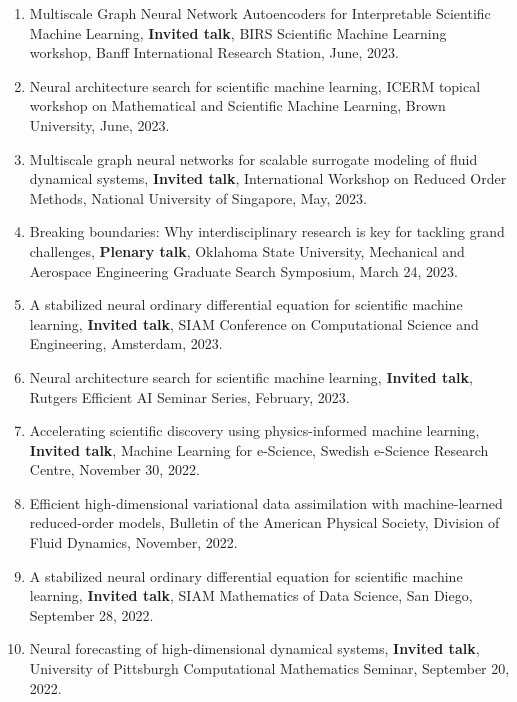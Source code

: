 \documentclass[letterpaper]{article}
\begin{document}
\begin{enumerate}
\item Multiscale Graph Neural Network Autoencoders for Interpretable Scientific Machine Learning, \textbf{Invited talk}, BIRS Scientific Machine Learning workshop, Banff International Research Station, June, 2023.

\item Neural architecture search for scientific machine learning, ICERM topical workshop on Mathematical and Scientific Machine Learning, Brown University, June, 2023.

\item Multiscale graph neural networks for scalable surrogate modeling of fluid dynamical systems, \textbf{Invited talk}, International Workshop on Reduced Order Methods, National University of Singapore, May, 2023.

\item Breaking boundaries: Why interdisciplinary research is key for tackling grand challenges, \textbf{Plenary talk}, Oklahoma State University, Mechanical and Aerospace Engineering Graduate Search Symposium, March 24, 2023.

\item A stabilized neural ordinary differential equation for scientific machine learning, \textbf{Invited talk}, SIAM Conference on Computational Science and Engineering, Amsterdam, 2023.

\item Neural architecture search for scientific machine learning, \textbf{Invited talk}, Rutgers Efficient AI Seminar Series, February, 2023.

\item Accelerating scientific discovery using physics-informed machine learning, \textbf{Invited talk}, Machine Learning for e-Science, Swedish e-Science Research Centre, November 30, 2022.

\item Efficient high-dimensional variational data assimilation with machine-learned reduced-order models, Bulletin of the American Physical Society, Division of Fluid Dynamics, November, 2022.

\item A stabilized neural ordinary differential equation for scientific machine learning, \textbf{Invited talk}, SIAM Mathematics of Data Science, San Diego, September 28, 2022.

\item Neural forecasting of high-dimensional dynamical systems, \textbf{Invited talk}, University of Pittsburgh Computational Mathematics Seminar, September 20, 2022.


\end{enumerate}
\end{document}
